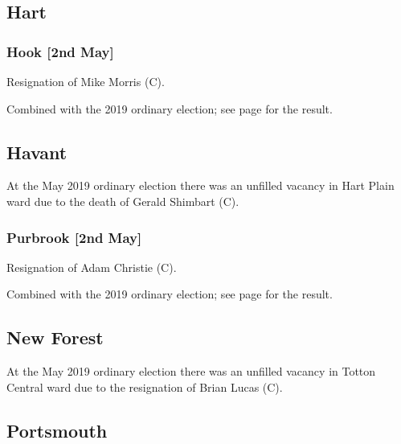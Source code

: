 \documentclass[a4paper,openany]{book}
\begin{document}
\begin{resultsiii}
\subsection*{Hart}

\subsubsection*{Hook \hspace*{\fill}\nolinebreak[1]%
	\enspace\hspace*{\fill}
	[2nd May]}


Resignation of Mike Morris (C).

Combined with the 2019 ordinary election; see page \pageref{HartHook} for the result.

\subsection*{Havant}

At the May 2019 ordinary election there was an unfilled vacancy in Hart Plain ward due to the death of Gerald Shimbart (C).

\subsubsection*{Purbrook \hspace*{\fill}\nolinebreak[1]%
	\enspace\hspace*{\fill}
	[2nd May]}


Resignation of Adam Christie (C).

Combined with the 2019 ordinary election; see page \pageref{HavantPurbrook} for the result.

\subsection*{New Forest}

At the May 2019 ordinary election there was an unfilled vacancy in Totton Central ward due to the resignation of Brian Lucas (C).

\subsection*{Portsmouth}


\end{resultsiii}
\end{document}
